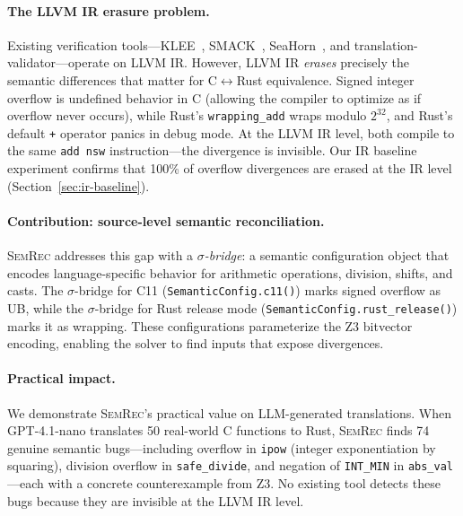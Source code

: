 \documentclass[11pt,a4paper]{article}
\begin{document}
\paragraph{The LLVM IR erasure problem.}
Existing verification tools---KLEE~\cite{cadar2008klee}, SMACK~\cite{rakamaric2014smack},
SeaHorn~\cite{gurfinkel2015seahorn}, and translation-validator---operate on
LLVM IR.  However, LLVM IR \emph{erases} precisely the semantic differences
that matter for C$\leftrightarrow$Rust equivalence.  Signed integer overflow
is undefined behavior in C (allowing the compiler to optimize as if overflow
never occurs), while Rust's \texttt{wrapping\_add} wraps modulo $2^{32}$, and
Rust's default \texttt{+} operator panics in debug mode.  At the LLVM IR level,
both compile to the same \texttt{add nsw} instruction---the divergence is
invisible.  Our IR baseline experiment confirms that 100\% of
overflow divergences are erased at the IR level (Section~\ref{sec:ir-baseline}).

\paragraph{Contribution: source-level semantic reconciliation.}
\textsc{SemRec} addresses this gap with a \emph{$\sigma$-bridge}: a semantic
configuration object that encodes language-specific behavior for arithmetic
operations, division, shifts, and casts.  The $\sigma$-bridge for C11
(\texttt{SemanticConfig.c11()}) marks signed overflow as UB, while the
$\sigma$-bridge for Rust release mode (\texttt{SemanticConfig.rust\_release()})
marks it as wrapping.  These configurations parameterize the Z3 bitvector
encoding, enabling the solver to find inputs that expose divergences.

\paragraph{Practical impact.}
We demonstrate \textsc{SemRec}'s practical value on LLM-generated translations.
When GPT-4.1-nano translates 50 real-world C functions to Rust, \textsc{SemRec}
finds 74 genuine semantic bugs---including overflow in \texttt{ipow}
(integer exponentiation by squaring), division overflow in
\texttt{safe\_divide}, and negation of \texttt{INT\_MIN} in
\texttt{abs\_val}---each with a concrete counterexample from Z3.  No existing
tool detects these bugs because they are invisible at the LLVM IR level.
\end{document}
